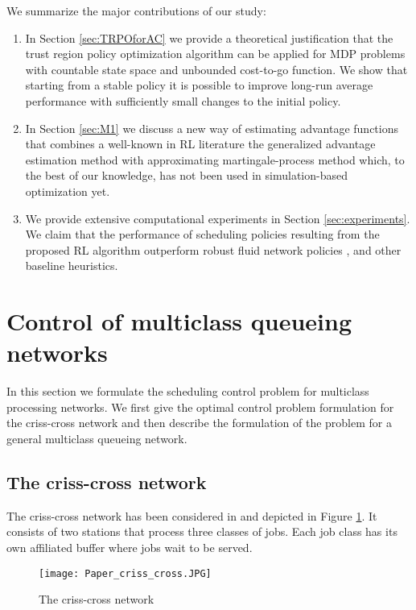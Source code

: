 \documentclass[11pt]{article}
\theoremstyle{definition}
\numberwithin{equation}{section}
\begin{document}
We summarize the major contributions of our study:
\begin{enumerate}
  \item In Section \ref{sec:TRPOforAC}    we provide a theoretical justification that the trust region policy optimization algorithm can be applied for  MDP problems with countable state space and unbounded cost-to-go function. We show that starting from a stable policy it is possible to improve long-run average performance  with sufficiently small changes to the initial policy.

\item In Section \ref{sec:M1} we discuss a new way of estimating  advantage functions that combines a well-known in RL literature the generalized advantage estimation method  \cite{Schulman2016} with approximating martingale-process method \cite{Henderson2002} which, to the best of our knowledge, has not been used in simulation-based optimization yet. 

  \item We provide extensive computational experiments in Section \ref{sec:experiments}. We claim that the performance of scheduling policies resulting from the proposed RL algorithm outperform  robust fluid network policies  \cite{Bertsimas2015}, \cite{Bertsimas2017} and other baseline heuristics.
    
   \end{enumerate}
 

\section{Control of multiclass queueing networks}\label{sec:MQN}

In this section we formulate the scheduling control problem for multiclass processing networks. We first give the optimal control problem formulation for the criss-cross network  and then describe the
formulation of the problem for a general multiclass queueing network.


\subsection{The criss-cross network}
The criss-cross network has been considered in \cite{Harrison1990} and depicted in Figure  \ref{fig:cc}. It consists of two stations that process three classes of jobs. Each job class  has its own affiliated buffer where jobs wait to be served.

\begin{figure}[h]
\centering%
\texttt{[image: Paper\_criss\_cross.JPG]}
\caption[]{The criss-cross network}
\label{fig:cc}%
\end{figure}
\end{document}
